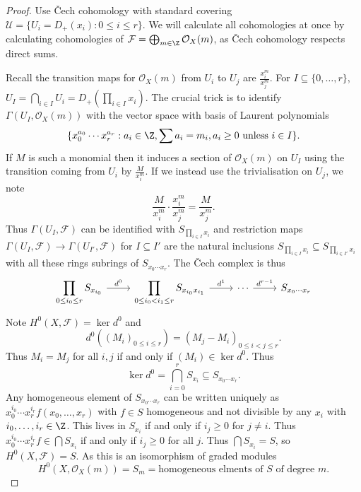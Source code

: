 \documentclass[a4paper]{article}
\newcommand{\sh}[1]{\mathcal{#1}} %
\begin{document}
\begin{proof}
  Use Čech cohomology with standard covering \(\mathcal U = \{U_i = D_+(x_i): 0 \leq i \leq r\}\). We will calculate all cohomologies at once by calculating cohomologies of \(\sh F = \bigoplus_{m \in \Z} \sh O_X(m)\), as Čech cohomology respects direct sums.

  Recall the transition maps for \(\sh O_X(m)\) from \(U_i\) to \(U_j\) are \(\frac{x_i^m}{x_j^m}\). For \(I \subseteq \{0, \dots, r\}\), \(U_I = \bigcap_{i \in I} U_i = D_+(\prod_{i \in I}x_i)\). The crucial trick is to identify \(\Gamma(U_I, \sh O_X(m))\) with the vector space with basis of Laurent polynomials
  \[
    \{x_0^{a_0} \cdots x_r^{a_r}: a_i \in \Z, \sum a_i = m_i, a_i \geq 0 \text{ unless } i \in I\}.
  \]
  If \(M\) is such a monomial then it induces a section of \(\sh O_X(m)\) on \(U_I\) using the transition coming from \(U_i\) by \(\frac{M}{x_i^m}\). If we instead use the trivialisation on \(U_j\), we note
  \[
    \frac{M}{x_i^m} \cdot \frac{x_i^m}{x_j^m} = \frac{M}{x_j^m}.
  \]
  Thus \(\Gamma(U_I, \sh F)\) can be identified with \(S_{\prod_{i \in I}x_i}\) and restriction maps \(\Gamma(U_I, \sh F) \to \Gamma(U_{I'}, \sh F)\) for \(I \subseteq I'\) are the natural inclusions \(S_{\prod_{i \in I} x_i} \subseteq S_{\prod_{i \in I'} x_i}\) with all these rings subrings of \(S_{x_0 \cdots x_r}\). The Čech complex is thus
  \[
    \begin{tikzcd}
      \displaystyle \prod_{0 \leq i_0 \leq r} S_{x_{i_0}} \ar[r, "d^0"] & \displaystyle \prod_{0 \leq i_0 < i_1 \leq r} S_{x_{i_0} x_{i_1}} \ar[r, "d^1"] & \cdots \ar[r, "d^{r - 1}"] & S_{x_0 \cdots x_r}
    \end{tikzcd}
  \]
  Note \(H^0(X, \sh F) = \ker d^0\) and
  \[
    d^0((M_i)_{0 \leq i \leq r}) = (M_j - M_i)_{0 \leq i < j \leq r}.
  \]
  Thus \(M_i = M_j\) for all \(i, j\) if and only if \((M_i) \in \ker d^0\). Thus
  \[
    \ker d^0 = \bigcap_{i = 0}^r S_{x_i} \subseteq S_{x_0 \cdots x_r}.
  \]
  Any homogeneous element of \(S_{x_0 \cdots x_r}\) can be written uniquely as \(x_0^{i_0} \cdots x_r^{i_r} f(x_0, \dots, x_r)\) with \(f \in S\) homogeneous and not divisible by any \(x_i\) with \(i_0, \dots, i_r \in \Z\). This lives in \(S_{x_i}\) if and only if \(i_j \geq 0\) for \(j \neq i\). Thus \(x_0^{i_0} \cdots x_r^{i_r} f \in \bigcap S_{x_i}\) if and only if \(i_j \geq 0\) for all \(j\). Thus \(\bigcap S_{x_i} = S\), so \(H^0(X, \sh F) = S\). As this is an isomorphism of graded modules
  \[
    H^0(X, \sh O_X(m)) = S_m = \text{homogeneous elments of \(S\) of degree \(m\)}.
  \]


\end{proof}
\end{document}
